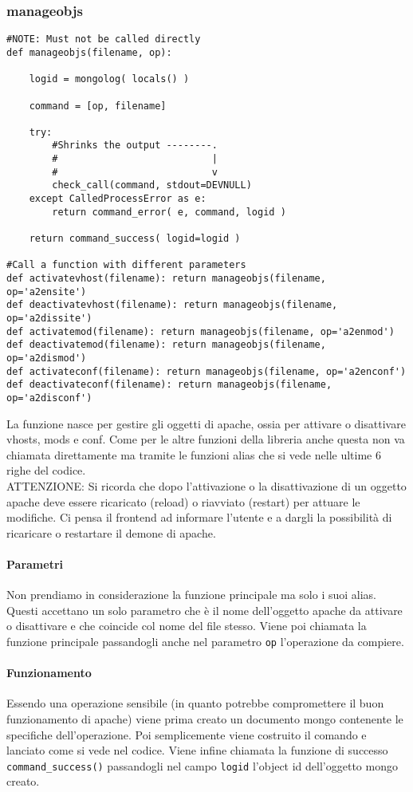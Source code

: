 \documentclass[11pt]{article}
\begin{document}
\subsubsection{manageobjs}\label{manageobjs}
\begin{lstlisting}
#NOTE: Must not be called directly
def manageobjs(filename, op):

    logid = mongolog( locals() )

    command = [op, filename]

    try:
        #Shrinks the output --------.
        #                           |
        #                           v
        check_call(command, stdout=DEVNULL)
    except CalledProcessError as e:
        return command_error( e, command, logid )

    return command_success( logid=logid )

#Call a function with different parameters
def activatevhost(filename): return manageobjs(filename, op='a2ensite')
def deactivatevhost(filename): return manageobjs(filename, op='a2dissite')
def activatemod(filename): return manageobjs(filename, op='a2enmod')
def deactivatemod(filename): return manageobjs(filename, op='a2dismod')
def activateconf(filename): return manageobjs(filename, op='a2enconf')
def deactivateconf(filename): return manageobjs(filename, op='a2disconf')
\end{lstlisting}
La funzione nasce per gestire gli oggetti di apache, ossia per attivare o disattivare vhosts, mods e conf. Come per le altre
funzioni della libreria anche questa non va chiamata direttamente ma tramite le funzioni alias che si vede nelle ultime 6 righe
del codice.\\
ATTENZIONE: Si ricorda che dopo l'attivazione o la disattivazione di un oggetto apache deve essere ricaricato (reload) o
riavviato (restart) per attuare le modifiche. Ci pensa il frontend ad informare l'utente e a dargli la possibilità
di ricaricare o restartare il demone di apache.
\paragraph{Parametri}
Non prendiamo in considerazione la funzione principale ma solo i suoi alias. Questi accettano un solo parametro che è il nome
dell'oggetto apache da attivare o disattivare e che coincide col nome del file stesso. Viene poi chiamata la funzione principale
passandogli anche nel parametro \texttt{op} l'operazione da compiere.
\paragraph{Funzionamento}
Essendo una operazione sensibile (in quanto potrebbe compromettere il buon funzionamento di apache) viene prima creato
un documento mongo contenente le specifiche dell'operazione. Poi semplicemente viene costruito il comando e lanciato
come si vede nel codice. Viene infine chiamata la funzione di successo \texttt{command\_success()} passandogli nel campo
\texttt{logid} l'object id dell'oggetto mongo creato.
\end{document}
